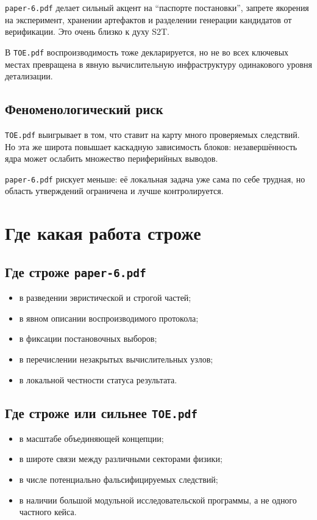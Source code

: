 \documentclass[12pt,a4paper]{article}
\begin{document}
\texttt{paper-6.pdf} делает сильный акцент на ``паспорте постановки'', запрете якорения на эксперимент, хранении артефактов и разделении генерации кандидатов от верификации. Это очень близко к духу S2T.

В \texttt{TOE.pdf} воспроизводимость тоже декларируется, но не во всех ключевых местах превращена в явную вычислительную инфраструктуру одинакового уровня детализации.

\subsection{Феноменологический риск}

\texttt{TOE.pdf} выигрывает в том, что ставит на карту много проверяемых следствий. Но эта же широта повышает каскадную зависимость блоков: незавершённость ядра может ослабить множество периферийных выводов.

\texttt{paper-6.pdf} рискует меньше: её локальная задача уже сама по себе трудная, но область утверждений ограничена и лучше контролируется.

\section{Где какая работа строже}

\subsection{Где строже \texttt{paper-6.pdf}}

\begin{itemize}
    \item в разведении эвристической и строгой частей;
    \item в явном описании воспроизводимого протокола;
    \item в фиксации постановочных выборов;
    \item в перечислении незакрытых вычислительных узлов;
    \item в локальной честности статуса результата.
\end{itemize}

\subsection{Где строже или сильнее \texttt{TOE.pdf}}

\begin{itemize}
    \item в масштабе объединяющей концепции;
    \item в широте связи между различными секторами физики;
    \item в числе потенциально фальсифицируемых следствий;
    \item в наличии большой модульной исследовательской программы, а не одного частного кейса.
\end{itemize}
\end{document}
